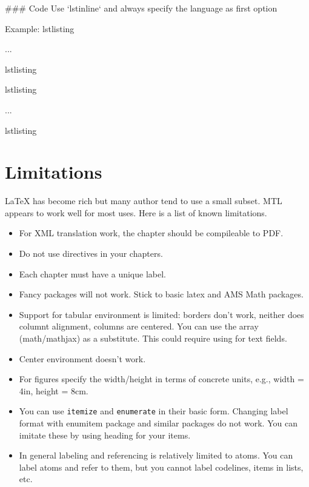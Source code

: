 \begin{example}
\begin{noten}
\begin{important}
\begin{definition}[Group]
### Code
Use `lstinline` and always specify the language as first option

Example:
{lstlisting}
\begin{lstinline}[language=C, numbers=left]
...
\end{lstinline}
{lstlisting}

{lstlisting}
\begin{lstinline}[language={[C0]C}, numbers=left]
...
\end{lstinline}
{lstlisting}

\section{Limitations}

LaTeX has become rich but many author tend to use a small subset.  MTL appears to work well for most uses. Here is a list of known limitations.
\begin{itemize}

\item For XML translation work, the chapter should be compileable to PDF.

\item Do not use \lstinline`` directives in your chapters.

\item Each chapter must have a unique label.

\item Fancy packages will not work.  Stick to basic latex and AMS Math packages.

\item Support for tabular environment is limited: borders don't work, neither does columnt alignment, columns are centered.  You can use the array (math/mathjax) as a substitute.  This could require using \mbox{} for text fields.  
 
\item Center environment doesn't work.

\item For figures specify the width/height in terms of concrete units, e.g.,
  width = 4in, height = 8cm.

\item You can use \lstinline`itemize` and \lstinline`enumerate` in their basic form.  Changing label format with enumitem package and similar packages do not work.  You can imitate these by using heading for your items.  

\item In general labeling and referencing is relatively limited to atoms.  You can label atoms and refer to them, but you cannot label codelines, items in lists, etc.


\end{itemize}
\end{definition}
\end{important}
\end{noten}
\end{example}
